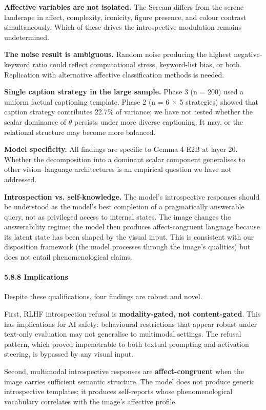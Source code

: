 \documentclass[11pt,a4paper]{article}
\begin{document}
\textbf{Affective variables are not isolated.} The Scream differs from the serene landscape in affect, complexity, iconicity, figure presence, and colour contrast simultaneously. Which of these drives the introspective modulation remains undetermined.

\textbf{The noise result is ambiguous.} Random noise producing the highest negative-keyword ratio could reflect computational stress, keyword-list bias, or both. Replication with alternative affective classification methods is needed.

\textbf{Single caption strategy in the large sample.} Phase 3 (n = 200) used a uniform factual captioning template. Phase 2 (n = 6 \ensuremath{\times} 5 strategies) showed that caption strategy contributes 22.7\% of variance; we have not tested whether the scalar dominance of $\theta$ persists under more diverse captioning. It may, or the relational structure may become more balanced.

\textbf{Model specificity.} All findings are specific to Gemma 4 E2B at layer 20. Whether the decomposition into a dominant scalar component generalises to other vision--language architectures is an empirical question we have not addressed.

\textbf{Introspection vs. self-knowledge.} The model's introspective responses should be understood as the model's best completion of a pragmatically answerable query, not as privileged access to internal states. The image changes the answerability regime; the model then produces affect-congruent language because its latent state has been shaped by the visual input. This is consistent with our disposition framework (the model processes through the image's qualities) but does not entail phenomenological claims.

\paragraph{5.8.8 Implications}

Despite these qualifications, four findings are robust and novel.

First, RLHF introspection refusal is \textbf{modality-gated, not content-gated}. This has implications for AI safety: behavioural restrictions that appear robust under text-only evaluation may not generalise to multimodal settings. The refusal pattern, which proved impenetrable to both textual prompting and activation steering, is bypassed by any visual input.

Second, multimodal introspective responses are \textbf{affect-congruent} when the image carries sufficient semantic structure. The model does not produce generic introspective templates; it produces self-reports whose phenomenological vocabulary correlates with the image's affective profile.
\end{document}
